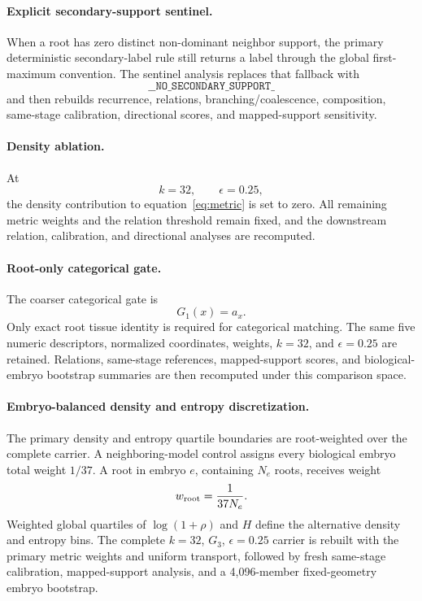 \documentclass[11pt]{article}
\begin{document}
\paragraph{Explicit secondary-support sentinel.}
When a root has zero distinct non-dominant neighbor support, the primary deterministic secondary-label rule still returns a label through the global first-maximum convention. The sentinel analysis replaces that fallback with
\[
\texttt{\_\_NO\_SECONDARY\_SUPPORT\_}
\]
and then rebuilds recurrence, relations, branching/coalescence, composition, same-stage calibration, directional scores, and mapped-support sensitivity.

\paragraph{Density ablation.}
At
\[
k=32,\qquad\epsilon=0.25,
\]
the density contribution to equation~\eqref{eq:metric} is set to zero. All remaining metric weights and the relation threshold remain fixed, and the downstream relation, calibration, and directional analyses are recomputed.

\paragraph{Root-only categorical gate.}
The coarser categorical gate is
\[
G_1(x)=a_x.
\]
Only exact root tissue identity is required for categorical matching. The same five numeric descriptors, normalized coordinates, weights, \(k=32\), and \(\epsilon=0.25\) are retained. Relations, same-stage references, mapped-support scores, and biological-embryo bootstrap summaries are then recomputed under this comparison space.

\paragraph{Embryo-balanced density and entropy discretization.}
The primary density and entropy quartile boundaries are root-weighted over the complete carrier. A neighboring-model control assigns every biological embryo total weight \(1/37\). A root in embryo \(e\), containing \(N_e\) roots, receives weight
\[
w_{\rm root}=\frac{1}{37N_e}.
\]
Weighted global quartiles of \(\log(1+\rho)\) and \(H\) define the alternative density and entropy bins. The complete \(k=32\), \(G_3\), \(\epsilon=0.25\) carrier is rebuilt with the primary metric weights and uniform transport, followed by fresh same-stage calibration, mapped-support analysis, and a 4,096-member fixed-geometry embryo bootstrap.
\end{document}
